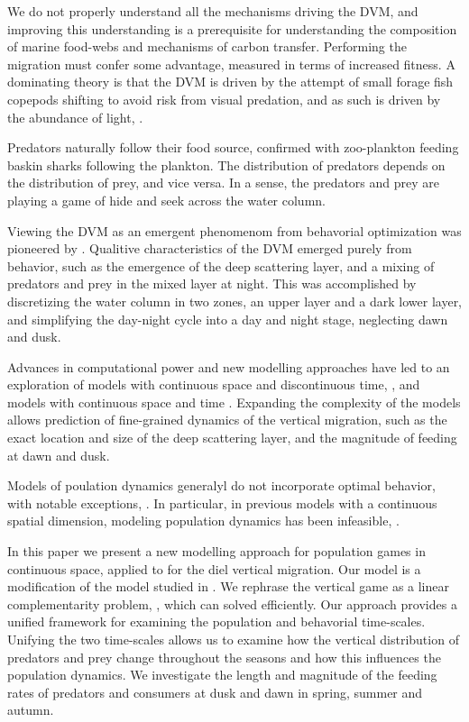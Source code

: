 We do not properly understand all the mechanisms driving the DVM, and improving this understanding is a prerequisite for understanding the composition of marine food-webs and mechanisms of carbon transfer. Performing the migration must confer some advantage, measured in terms of increased fitness. A dominating theory is that the DVM is driven by the attempt of small forage fish copepods shifting to avoid risk from visual predation, and as such is driven by the abundance of light, \citep{nilsson2003vertical}.

Predators naturally follow their food source, confirmed \citep{sims2005habitat} with zoo-plankton feeding baskin sharks following the plankton. The distribution of predators depends on the distribution of prey, and vice versa. In a sense, the predators and prey are playing a game of hide and seek across the water column.


Viewing the DVM as an emergent phenomenom from behavorial optimization was pioneered by \citep{iwasa1982vertical}. Qualitive characteristics of the DVM emerged purely from behavior, such as the emergence of the deep scattering layer, and a mixing of predators and prey in the mixed layer at night. This was accomplished by discretizing the water column in two zones, an upper layer and a dark lower layer, and simplifying the day-night cycle into a day and night stage, neglecting dawn and dusk.

Advances in computational power and new modelling approaches have led to an exploration of models with continuous space and discontinuous time, \citep{jerome}, and models with continuous space and time \citep{verticalmigration}.
Expanding the complexity of the models allows prediction of fine-grained dynamics of the vertical migration, such as the exact location and size of the deep scattering layer, and the magnitude of feeding at dawn and dusk.



Models of poulation dynamics generalyl do not incorporate optimal behavior, with notable exceptions, \citep{Krivan1998,genkai2007macrophyte}. In particular, in previous models with a continuous spatial dimension, modeling population dynamics has been infeasible, \citep{pinti2019trophic}.


In this paper we present a new modelling approach for population games in continuous space, applied to for the diel vertical migration. Our model is a modification of the model studied in \citep{verticalmigration}. We rephrase the vertical game as a linear complementarity problem, \citep{miller1991copositive}, which can solved efficiently. Our approach provides a unified framework for examining the population and behavorial time-scales.  Unifying the two time-scales allows us to examine how the vertical distribution of predators and prey change throughout the seasons and how this influences the population dynamics. We investigate the length and magnitude of the feeding rates of predators and consumers at dusk and dawn in spring, summer and autumn.

